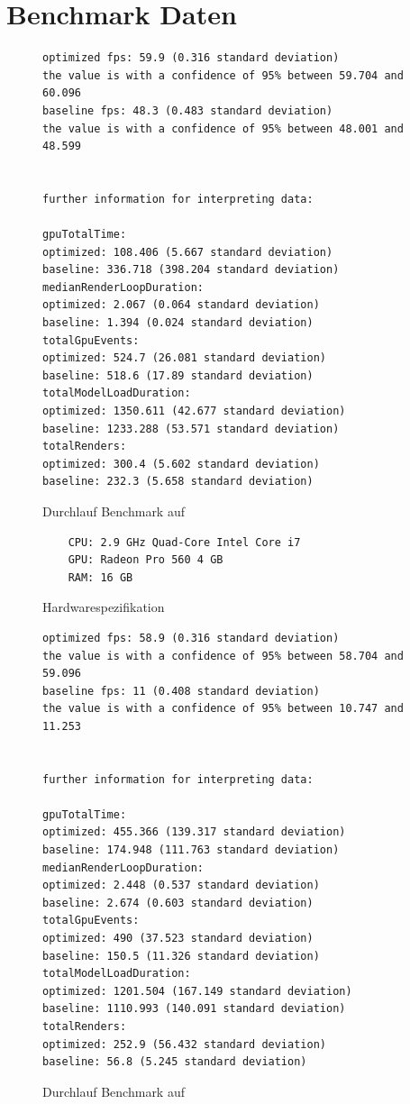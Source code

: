 \section{Benchmark Daten}
\begin{figure}[H]
  \begin{lstlisting}
optimized fps: 59.9 (0.316 standard deviation)
the value is with a confidence of 95% between 59.704 and 60.096
baseline fps: 48.3 (0.483 standard deviation)
the value is with a confidence of 95% between 48.001 and 48.599


further information for interpreting data:

gpuTotalTime:
optimized: 108.406 (5.667 standard deviation)
baseline: 336.718 (398.204 standard deviation)
medianRenderLoopDuration:
optimized: 2.067 (0.064 standard deviation)
baseline: 1.394 (0.024 standard deviation)
totalGpuEvents:
optimized: 524.7 (26.081 standard deviation)
baseline: 518.6 (17.89 standard deviation)
totalModelLoadDuration:
optimized: 1350.611 (42.677 standard deviation)
baseline: 1233.288 (53.571 standard deviation)
totalRenders:
optimized: 300.4 (5.602 standard deviation)
baseline: 232.3 (5.658 standard deviation)
  \end{lstlisting}
\caption{Durchlauf Benchmark auf }
\label{fig:marcbookBenchmarkRun}
\end{figure}

\begin{figure}[H]
  \begin{lstlisting}
    CPU: 2.9 GHz Quad-Core Intel Core i7
    GPU: Radeon Pro 560 4 GB
    RAM: 16 GB
  \end{lstlisting}
\caption{Hardwarespezifikation }
\label{fig:marcbookProSpecification}
\end{figure}

\begin{figure}[H]
  \begin{lstlisting}
optimized fps: 58.9 (0.316 standard deviation)
the value is with a confidence of 95% between 58.704 and 59.096
baseline fps: 11 (0.408 standard deviation)
the value is with a confidence of 95% between 10.747 and 11.253


further information for interpreting data:

gpuTotalTime:
optimized: 455.366 (139.317 standard deviation)
baseline: 174.948 (111.763 standard deviation)
medianRenderLoopDuration:
optimized: 2.448 (0.537 standard deviation)
baseline: 2.674 (0.603 standard deviation)
totalGpuEvents:
optimized: 490 (37.523 standard deviation)
baseline: 150.5 (11.326 standard deviation)
totalModelLoadDuration:
optimized: 1201.504 (167.149 standard deviation)
baseline: 1110.993 (140.091 standard deviation)
totalRenders:
optimized: 252.9 (56.432 standard deviation)
baseline: 56.8 (5.245 standard deviation)
  \end{lstlisting}
\caption{Durchlauf Benchmark auf }
\label{fig:windowsBenchmarkRun}
\end{figure}

